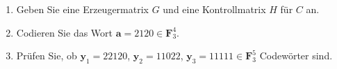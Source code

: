 \begin{aufgabe}
\begin{enumerate}[label=\alph*)]
\item Geben Sie eine Erzeugermatrix $G$ und eine Kontrollmatrix $H$ für $C$ an.
\item Codieren Sie das Wort $\mathbf{a} = 2120 \in \mathbf{F}_3^4$.
\item Prüfen Sie, ob $\mathbf{y}_1 = 22120$, $\mathbf{y}_2 = 11022$, $\mathbf{y}_3 = 11111 \in \mathbf{F}_3^5$ Codewörter sind.
\end{enumerate}
\end{aufgabe}
